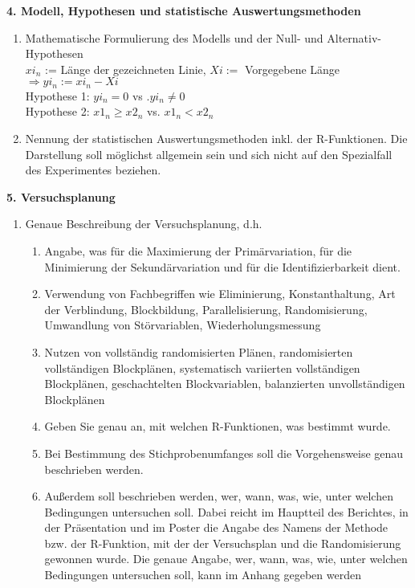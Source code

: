 \documentclass[ ngerman, fontsize= 12pt, paper=a4, headings=big, titlepage=true]{article}
\begin{document}
\textbf{4. Modell, Hypothesen und statistische Auswertungsmethoden}
\begin{enumerate}[-]
	\item  Mathematische Formulierung des Modells und der Null- und Alternativ-Hypothesen \\
		$xi_n$ := Länge  der gezeichneten Linie, $Xi:=$ Vorgegebene Länge $\Rightarrow yi_n := xi_n-Xi$ \\
		Hypothese 1: $yi_n =0 $  vs $. yi_n \neq 0$ \\
		Hypothese 2: $x1_n \geq x2_n  $ vs. $ x1_n < x2_n$
	\item Nennung der statistischen Auswertungsmethoden inkl. der R-Funktionen. Die Darstellung soll möglichst allgemein sein und sich nicht auf den Spezialfall des Experimentes
	beziehen.
\end{enumerate}

\textbf{5. Versuchsplanung}
\begin{enumerate}[-]
	\item  Genaue Beschreibung der Versuchsplanung, d.h.
	\begin{enumerate}[*]
		\item Angabe, was für die Maximierung der Primärvariation, für die Minimierung der
		Sekundärvariation und für die Identifizierbarkeit dient.
		\item Verwendung von Fachbegriffen wie Eliminierung, Konstanthaltung, Art der Verblindung, Blockbildung, Parallelisierung, Randomisierung, Umwandlung von Störvariablen, Wiederholungsmessung
		\item Nutzen von vollständig randomisierten Plänen, randomisierten vollständigen Blockplänen, systematisch variierten vollständigen Blockplänen, geschachtelten Blockvariablen, balanzierten unvollständigen Blockplänen

		\item Geben Sie genau an, mit welchen R-Funktionen, was bestimmt wurde.
		\item Bei Bestimmung des Stichprobenumfanges soll die Vorgehensweise genau beschrieben
		werden. 
		\item Außerdem soll beschrieben werden, wer, wann, was, wie, unter welchen Bedingungen
		untersuchen soll. Dabei reicht im Hauptteil des Berichtes, in der Präsentation und
		im Poster die Angabe des Namens der Methode bzw. der R-Funktion, mit der
		der Versuchsplan und die Randomisierung gewonnen wurde. Die genaue Angabe,
		wer, wann, was, wie, unter welchen Bedingungen untersuchen soll, kann im Anhang
		gegeben werden
		
	\end{enumerate}
\end{enumerate}
\end{document}
